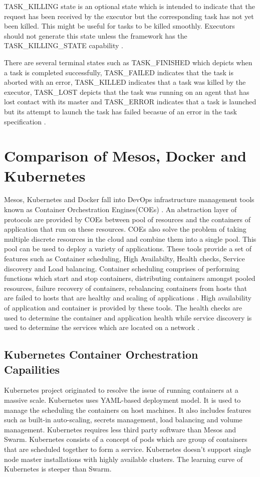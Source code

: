 \documentclass[9pt,twocolumn,twoside]{../../styles/osajnl}
\begin{document}
TASK\_KILLING state is an optional state which is intended to indicate
that the request has been received by the executor but the
corresponding task has not yet been killed. This might be useful for
tasks to be killed smoothly.  Executors should not generate this state
unless the framework has the TASK\_KILLING\_STATE capability
\cite{www-mesos-frmwrk}.

There are several terminal states such as TASK\_FINISHED which depicts
when a task is completed successfully, TASK\_FAILED indicates that the
task is aborted with an error, TASK\_KILLED indicates that a task was
killed by the executor, TASK\_LOST depicts that the task was running
on an agent that has lost contact with its master and TASK\_ERROR
indicates that a task is launched but its attempt to launch the task
has failed becasue of an error in the task specification
\cite{www-mesos-frmwrk}.

\section{Comparison of Mesos, Docker and Kubernetes}
Mesos, Kubernetes and Docker fall into DevOps infrastructure
management tools known as Container Orchestration Engines(COEs)
\cite{mesos-cmp}. An abstraction layer of protocols are provided by
COEs between pool of resources and the containers of application that
run on these resources. COEs also solve the problem of taking multiple
discrete resources in the cloud and combine them into a single
pool. This pool can be used to deploy a variety of applications. These
tools provide a set of features such as Container scheduling, High
Availabilty, Health checks, Service discovery and Load
balancing. Container scheduling comprises of performing functions
which start and stop containers, distributing containers amongst
pooled resources, failure recovery of containers, rebalancing
containers from hosts that are failed to hosts that are healthy and
scaling of applications \cite{mesos-cmp}. High availability of
application and container is provided by these tools. The health
checks are used to determine the container and application health
while service discovery is used to determine the services which are
located on a network \cite{mesos-cmp}.

\subsection{Kubernetes Container Orchestration Capailities}
Kubernetes project originated to resolve the issue of running
containers at a massive scale. Kubernetes uses YAML-based deployment
model. It is used to manage the scheduling the containers on host
machines. It also includes features such as built-in auto-scaling,
secrets management, load balancing and volume management. Kubernetes
requires less third party software than Mesos and Swarm. Kubernetes
consists of a concept of pods which are group of containers that are
scheduled together to form a service. Kubernetes doesn't support
single node master installations with highly available clusters. The
learning curve of Kubernetes is steeper than Swarm.
\end{document}
